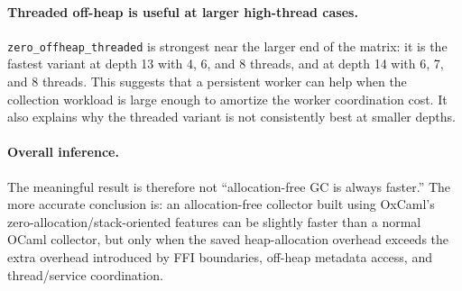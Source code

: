 \documentclass[11pt,a4paper]{article}
\begin{document}
\paragraph{Threaded off-heap is useful at larger high-thread cases.}
\texttt{zero\_offheap\_threaded} is strongest near the larger end of the matrix:
it is the fastest variant at depth 13 with 4, 6, and 8 threads, and at depth 14
with 6, 7, and 8 threads. This suggests that a persistent worker can help when
the collection workload is large enough to amortize the worker coordination
cost. It also explains why the threaded variant is not consistently best at
smaller depths.

\paragraph{Overall inference.}
The meaningful result is therefore not ``allocation-free GC is always faster.''
The more accurate conclusion is: an allocation-free collector built using
OxCaml's zero-allocation/stack-oriented features can be slightly faster than a
normal OCaml collector, but only when the saved heap-allocation overhead exceeds
the extra overhead introduced by FFI boundaries, off-heap metadata access, and
thread/service coordination.
\end{document}
